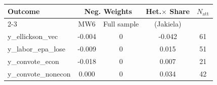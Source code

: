 \begin{tabular}{lcccc}
\toprule
\multirow{2}{*}{Outcome} & \multicolumn{2}{c}{Neg. Weights} & Het.\(\times\) Share & \multirow{2}{*}{\(N_{\text{att}}\)} \\
\cmidrule(r){2-3}
 & MW6 & Full sample & (Jakiela) & \\
\midrule
y\_ellickson\_vec & -0.004 & 0 & -0.042 & 61 \\
y\_labor\_epa\_lose & -0.009 & 0 & 0.015 & 51 \\
y\_convote\_econ & -0.018 & 0 & 0.007 & 21 \\
y\_convote\_nonecon & 0.000 & 0 & 0.034 & 42 \\
\bottomrule
\end{tabular}
